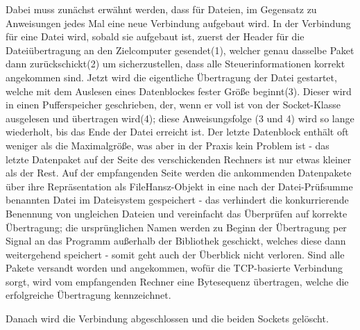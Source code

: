 Dabei muss zunächst erwähnt werden, dass für Dateien, im Gegensatz zu Anweisungen jedes Mal eine neue Verbindung aufgebaut wird.
In der Verbindung für eine Datei wird, sobald sie aufgebaut ist, zuerst der Header für die Dateiübertragung an den Zielcomputer gesendet(1), welcher genau dasselbe Paket dann zurückschickt(2) um sicherzustellen, dass alle Steuerinformationen korrekt angekommen sind.
Jetzt wird die eigentliche Übertragung der Datei gestartet, welche mit dem Auslesen eines Datenblockes fester Größe beginnt(3).
Dieser wird in einen Pufferspeicher geschrieben, der, wenn er voll ist von der Socket-Klasse ausgelesen und übertragen wird(4); diese Anweisungsfolge (3 und 4) wird so lange wiederholt, bis das Ende der Datei erreicht ist.
Der letzte Datenblock enthält oft weniger als die Maximalgröße, was aber in der Praxis kein Problem ist - das letzte Datenpaket auf der Seite des verschickenden Rechners ist nur etwas kleiner als der Rest.
Auf der empfangenden Seite werden die ankommenden Datenpakete über ihre Repräsentation als FileHansz-Objekt in eine nach der Datei-Prüfsumme benannten Datei im Dateisystem gespeichert - das verhindert die konkurrierende Benennung von ungleichen Dateien und vereinfacht das Überprüfen auf korrekte Übertragung; die ursprünglichen Namen werden zu Beginn der Übertragung per Signal an das Programm außerhalb der Bibliothek geschickt, welches diese dann weitergehend speichert - somit geht auch der Überblick nicht verloren.
Sind alle Pakete versandt worden und angekommen, wofür die TCP-basierte Verbindung sorgt, wird vom empfangenden Rechner eine Bytesequenz übertragen, welche die erfolgreiche Übertragung kennzeichnet.\par
Danach wird die Verbindung abgeschlossen und die beiden Sockets gelöscht.\\
%